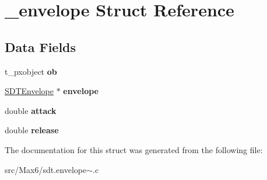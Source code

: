 \hypertarget{struct__envelope}{}\section{\+\_\+envelope Struct Reference}
\label{struct__envelope}
\subsection*{Data Fields}
\begin{DoxyCompactItemize}
\item 
\hypertarget{struct__envelope_a55b4380edb216f04a1c42b9095594963}{}t\+\_\+pxobject {\bfseries ob}\label{struct__envelope_a55b4380edb216f04a1c42b9095594963}

\item 
\hypertarget{struct__envelope_a5a0733fa8ca60bc3a4b81afb36a46c48}{}\hyperlink{struct_s_d_t_envelope}{S\+D\+T\+Envelope} $\ast$ {\bfseries envelope}\label{struct__envelope_a5a0733fa8ca60bc3a4b81afb36a46c48}

\item 
\hypertarget{struct__envelope_a7490b6921178ac7c03d501496c414db9}{}double {\bfseries attack}\label{struct__envelope_a7490b6921178ac7c03d501496c414db9}

\item 
\hypertarget{struct__envelope_a11fad626047f2e68b486f756999b2c79}{}double {\bfseries release}\label{struct__envelope_a11fad626047f2e68b486f756999b2c79}

\end{DoxyCompactItemize}


The documentation for this struct was generated from the following file\+:\begin{DoxyCompactItemize}
\item 
src/\+Max6/sdt.\+envelope$\sim$.\+c\end{DoxyCompactItemize}

